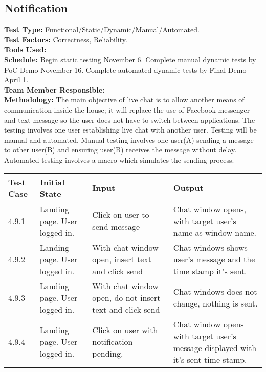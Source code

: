 \documentclass[12pt]{article}
\begin{document}
\subsection{Notification}
\textbf{Test Type:} Functional/Static/Dynamic/Manual/Automated. \\
\textbf{Test Factors:} Correctness, Reliability. \\
\textbf{Tools Used:} \\
\textbf{Schedule:} Begin static testing November 6. Complete manual dynamic tests by PoC Demo November 16. Complete automated dynamic tests by Final Demo April 1. \\
\textbf{Team Member Responsible:} \\
\textbf{Methodology:} The main objective of live chat is to allow another means of communication inside the house; it will replace the use of Facebook messenger and text message so the user does not have to switch between applications. The testing involves one user establishing live chat with another user. Testing will be manual and automated. Manual testing involves one user(A) sending a message to other user(B) and ensuring user(B) receives the message without delay. Automated testing involves a macro which simulates the sending process.
\newline
\newline
\newline
\newline
\begin{longtable}{|p{2cm}|p{3cm}|p{5cm}|p{5cm}|}
    \hline
    \textbf{Test Case}  & \textbf{Initial State} & \textbf{Input} & \textbf{Output} \\ \hline
    4.9.1 & Landing page. User logged in. & Click on user to send message & Chat window opens, with target user's name as window name. \\ 
    \hline
    4.9.2 & Landing page. User logged in. & With chat window open, insert text and click send & Chat windows shows user's message and the time stamp it's sent. \\ 
    \hline
    4.9.3 & Landing page. User logged in. & With chat window open, do not insert text and click send & Chat windows does not change, nothing is sent. \\ 
    \hline
    4.9.4 & Landing page. User logged in. & Click on user with notification pending. & Chat window opens with target user's message displayed with it's sent time stamp. \\
    \hline
\end{longtable}
\end{document}
